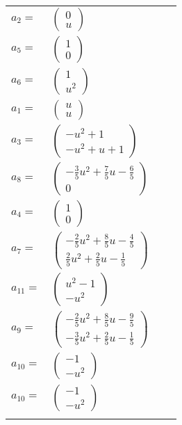 \documentclass[1p]{elsarticle_modified}
\theoremstyle{definition}
\begin{document}
\begin{tabular}{m{7pt} m{180pt} m{7pt} m{180pt} }
\flushright $a_{2}=$&$\begin{pmatrix}0\\u\end{pmatrix}$ \\
\flushright $a_{5}=$&$\begin{pmatrix}1\\0\end{pmatrix}$ \\
\flushright $a_{6}=$&$\begin{pmatrix}1\\u^2\end{pmatrix}$ \\
\flushright $a_{1}=$&$\begin{pmatrix}u\\u\end{pmatrix}$ \\
\flushright $a_{3}=$&$\begin{pmatrix}- u^2+1\\- u^2+u+1\end{pmatrix}$ \\
\flushright $a_{8}=$&$\begin{pmatrix}-\frac{3}{5} u^2+\frac{7}{5} u-\frac{6}{5}\\0\end{pmatrix}$ \\
\flushright $a_{4}=$&$\begin{pmatrix}1\\0\end{pmatrix}$ \\
\flushright $a_{7}=$&$\begin{pmatrix}-\frac{2}{5} u^2+\frac{8}{5} u-\frac{4}{5}\\\frac{2}{5} u^2+\frac{2}{5} u-\frac{1}{5}\end{pmatrix}$ \\
\flushright $a_{11}=$&$\begin{pmatrix}u^2-1\\- u^2\end{pmatrix}$ \\
\flushright $a_{9}=$&$\begin{pmatrix}-\frac{2}{5} u^2+\frac{8}{5} u-\frac{9}{5}\\-\frac{3}{5} u^2+\frac{2}{5} u-\frac{1}{5}\end{pmatrix}$ \\
\flushright $a_{10}=$&$\begin{pmatrix}-1\\- u^2\end{pmatrix}$\\ \flushright $a_{10}=$&$\begin{pmatrix}-1\\- u^2\end{pmatrix}$\\&\end{tabular}
\end{document}
